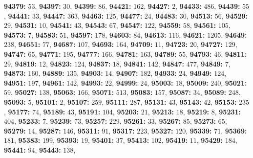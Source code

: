 \textsf{\bfseries 94379:} $53$, \textsf{\bfseries 94397:} $30$, \textsf{\bfseries 94399:} $86$, \textsf{\bfseries 94421:} $162$, \textsf{\bfseries 94427:} $2$, \textsf{\bfseries 94433:} $486$, \textsf{\bfseries 94439:} $55$, \textsf{\bfseries 94441:} $33$, \textsf{\bfseries 94447:} $363$, \textsf{\bfseries 94463:} $125$, \textsf{\bfseries 94477:} $24$, \textsf{\bfseries 94483:} $30$, \textsf{\bfseries 94513:} $56$, \textsf{\bfseries 94529:} $29$, \textsf{\bfseries 94531:} $10$, \textsf{\bfseries 94541:} $43$, \textsf{\bfseries 94543:} $67$, \textsf{\bfseries 94547:} $122$, \textsf{\bfseries 94559:} $58$, \textsf{\bfseries 94561:} $105$, \textsf{\bfseries 94573:} $7$, \textsf{\bfseries 94583:} $51$, \textsf{\bfseries 94597:} $178$, \textsf{\bfseries 94603:} $84$, \textsf{\bfseries 94613:} $116$, \textsf{\bfseries 94621:} $1205$, \textsf{\bfseries 94649:} $238$, \textsf{\bfseries 94651:} $77$, \textsf{\bfseries 94687:} $107$, \textsf{\bfseries 94693:} $164$, \textsf{\bfseries 94709:} $11$, \textsf{\bfseries 94723:} $20$, \textsf{\bfseries 94727:} $129$, \textsf{\bfseries 94747:} $65$, \textsf{\bfseries 94771:} $195$, \textsf{\bfseries 94777:} $166$, \textsf{\bfseries 94781:} $163$, \textsf{\bfseries 94789:} $55$, \textsf{\bfseries 94793:} $46$, \textsf{\bfseries 94811:} $29$, \textsf{\bfseries 94819:} $12$, \textsf{\bfseries 94823:} $124$, \textsf{\bfseries 94837:} $18$, \textsf{\bfseries 94841:} $142$, \textsf{\bfseries 94847:} $477$, \textsf{\bfseries 94849:} $7$, \textsf{\bfseries 94873:} $160$, \textsf{\bfseries 94889:} $135$, \textsf{\bfseries 94903:} $14$, \textsf{\bfseries 94907:} $182$, \textsf{\bfseries 94933:} $24$, \textsf{\bfseries 94949:} $124$, \textsf{\bfseries 94951:} $197$, \textsf{\bfseries 94961:} $142$, \textsf{\bfseries 94993:} $22$, \textsf{\bfseries 94999:} $24$, \textsf{\bfseries 95003:} $18$, \textsf{\bfseries 95009:} $240$, \textsf{\bfseries 95021:} $59$, \textsf{\bfseries 95027:} $138$, \textsf{\bfseries 95063:} $166$, \textsf{\bfseries 95071:} $513$, \textsf{\bfseries 95083:} $157$, \textsf{\bfseries 95087:} $34$, \textsf{\bfseries 95089:} $248$, \textsf{\bfseries 95093:} $5$, \textsf{\bfseries 95101:} $2$, \textsf{\bfseries 95107:} $259$, \textsf{\bfseries 95111:} $287$, \textsf{\bfseries 95131:} $43$, \textsf{\bfseries 95143:} $42$, \textsf{\bfseries 95153:} $235$, \textsf{\bfseries 95177:} $74$, \textsf{\bfseries 95189:} $43$, \textsf{\bfseries 95191:} $104$, \textsf{\bfseries 95203:} $21$, \textsf{\bfseries 95213:} $18$, \textsf{\bfseries 95219:} $8$, \textsf{\bfseries 95231:} $404$, \textsf{\bfseries 95233:} $7$, \textsf{\bfseries 95239:} $73$, \textsf{\bfseries 95257:} $229$, \textsf{\bfseries 95261:} $33$, \textsf{\bfseries 95267:} $85$, \textsf{\bfseries 95273:} $65$, \textsf{\bfseries 95279:} $14$, \textsf{\bfseries 95287:} $146$, \textsf{\bfseries 95311:} $91$, \textsf{\bfseries 95317:} $223$, \textsf{\bfseries 95327:} $120$, \textsf{\bfseries 95339:} $71$, \textsf{\bfseries 95369:} $181$, \textsf{\bfseries 95383:} $199$, \textsf{\bfseries 95393:} $19$, \textsf{\bfseries 95401:} $37$, \textsf{\bfseries 95413:} $102$, \textsf{\bfseries 95419:} $11$, \textsf{\bfseries 95429:} $184$, \textsf{\bfseries 95441:} $94$, \textsf{\bfseries 95443:} $138$, 
